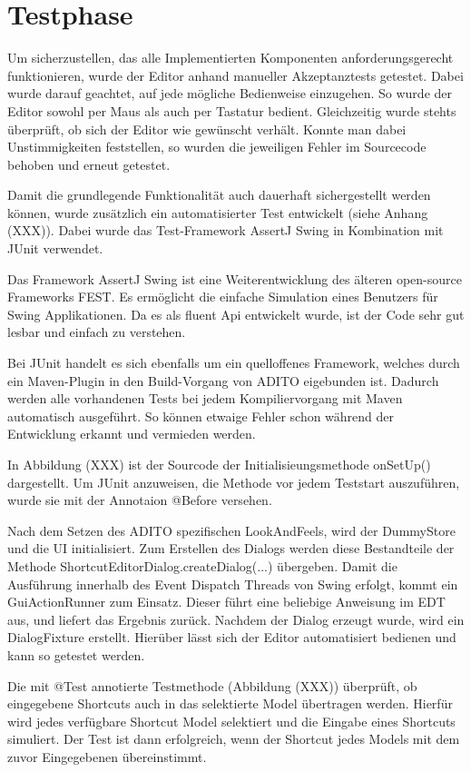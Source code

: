 \section{Testphase}

Um sicherzustellen, das alle Implementierten Komponenten anforderungsgerecht funktionieren, wurde der Editor anhand manueller Akzeptanztests getestet. Dabei wurde darauf geachtet, auf jede mögliche Bedienweise einzugehen. So wurde der Editor sowohl per Maus als auch per Tastatur bedient. Gleichzeitig wurde stehts überprüft, ob sich der Editor wie gewünscht verhält. Konnte man dabei Unstimmigkeiten feststellen, so wurden die jeweiligen Fehler im Sourcecode behoben und erneut getestet.

Damit die grundlegende Funktionalität auch dauerhaft sichergestellt werden können, wurde zusätzlich ein automatisierter Test entwickelt (siehe Anhang (XXX)). Dabei wurde das Test-Framework AssertJ Swing in Kombination mit JUnit verwendet.

Das Framework AssertJ Swing ist eine Weiterentwicklung des älteren open-source Frameworks FEST. Es ermöglicht die einfache Simulation eines Benutzers für Swing Applikationen. Da es als fluent Api entwickelt wurde, ist der Code sehr gut lesbar und einfach zu verstehen.

Bei JUnit handelt es sich ebenfalls um ein quelloffenes Framework, welches durch ein Maven-Plugin in den Build-Vorgang von ADITO eigebunden ist. Dadurch werden alle vorhandenen Tests bei jedem Kompiliervorgang mit Maven automatisch ausgeführt. So können etwaige Fehler schon während der Entwicklung erkannt und vermieden werden.



In Abbildung (XXX) ist der Sourcode der Initialisieungsmethode onSetUp() dargestellt. Um JUnit anzuweisen, die Methode vor jedem Teststart auszuführen, wurde sie mit der Annotaion @Before versehen. 

\vspace{10px}

Nach dem Setzen des ADITO spezifischen LookAndFeels, wird der DummyStore und die UI initialisiert. Zum Erstellen des Dialogs werden diese Bestandteile der Methode ShortcutEditorDialog.createDialog(...) übergeben. Damit die Ausführung innerhalb des Event Dispatch Threads von Swing erfolgt, kommt ein GuiActionRunner zum Einsatz. Dieser führt eine beliebige Anweisung im EDT aus, und liefert das Ergebnis zurück. Nachdem der Dialog erzeugt wurde, wird ein DialogFixture erstellt. Hierüber lässt sich der Editor automatisiert bedienen und kann so getestet werden.



Die mit @Test annotierte Testmethode (Abbildung (XXX)) überprüft, ob eingegebene Shortcuts auch in das selektierte Model übertragen werden. Hierfür wird jedes verfügbare Shortcut Model selektiert und die Eingabe eines Shortcuts simuliert. Der Test ist dann erfolgreich, wenn der Shortcut jedes Models mit dem zuvor Eingegebenen übereinstimmt.
\newpage